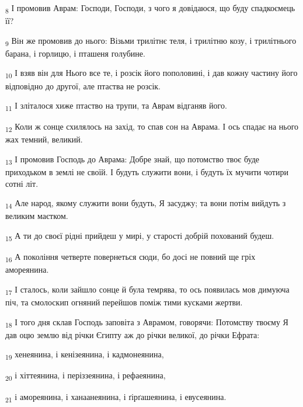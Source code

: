 \begin{tcolorbox}
\textsubscript{8} І промовив Аврам: Господи, Господи, з чого я довідаюся, що буду спадкоємець її?
\end{tcolorbox}
\begin{tcolorbox}
\textsubscript{9} Він же промовив до нього: Візьми трилітнє теля, і трилітню козу, і трилітнього барана, і горлицю, і пташеня голубине.
\end{tcolorbox}
\begin{tcolorbox}
\textsubscript{10} І взяв він для Нього все те, і розсік його пополовині, і дав кожну частину його відповідно до другої, але птаства не розсік.
\end{tcolorbox}
\begin{tcolorbox}
\textsubscript{11} І зліталося хиже птаство на трупи, та Аврам відганяв його.
\end{tcolorbox}
\begin{tcolorbox}
\textsubscript{12} Коли ж сонце схилялось на захід, то спав сон на Аврама. І ось спадає на нього жах темний, великий.
\end{tcolorbox}
\begin{tcolorbox}
\textsubscript{13} І промовив Господь до Аврама: Добре знай, що потомство твоє буде приходьком в землі не своїй. І будуть служити вони, і будуть їх мучити чотири сотні літ.
\end{tcolorbox}
\begin{tcolorbox}
\textsubscript{14} Але народ, якому служити вони будуть, Я засуджу; та вони потім вийдуть з великим маєтком.
\end{tcolorbox}
\begin{tcolorbox}
\textsubscript{15} А ти до своєї рідні прийдеш у мирі, у старості добрій похований будеш.
\end{tcolorbox}
\begin{tcolorbox}
\textsubscript{16} А покоління четверте повернеться сюди, бо досі не повний ще гріх амореянина.
\end{tcolorbox}
\begin{tcolorbox}
\textsubscript{17} І сталось, коли зайшло сонце й була темрява, то ось появилась мов димуюча піч, та смолоскип огняний перейшов поміж тими кусками жертви.
\end{tcolorbox}
\begin{tcolorbox}
\textsubscript{18} І того дня склав Господь заповіта з Аврамом, говорячи: Потомству твоєму Я дав оцю землю від річки Єгипту аж до річки великої, до річки Ефрата:
\end{tcolorbox}
\begin{tcolorbox}
\textsubscript{19} хенеянина, і кенізеянина, і кадмонеянина,
\end{tcolorbox}
\begin{tcolorbox}
\textsubscript{20} і хіттеянина, і періззеянина, і рефаеянина,
\end{tcolorbox}
\begin{tcolorbox}
\textsubscript{21} і амореянина, і ханаанеянина, і ґірґашеянина, і евусеянина.
\end{tcolorbox}
